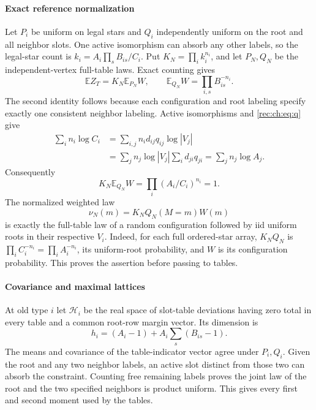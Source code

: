 \documentclass[11pt]{article}
\theoremstyle{definition}
\theoremstyle{remark}
\newcommand{\E}{\mathbb E}
\newcommand{\1}{\mathbf 1}
\begin{document}
\paragraph{Exact reference normalization}
Let $P_i$ be uniform on legal stars and $Q_i$ independently uniform on the root and all neighbor slots. One active isomorphism can absorb any other labels, so the legal-star count is $k_i=A_i\prod_sB_{is}/C_i$. Put $K_N=\prod_i k_i^{n_i}$, and let $P_N,Q_N$ be the independent-vertex full-table laws. Exact counting gives
\begin{equation}\label{rec:ch:eq:normalizers}
 \E Z_T=K_N\E_{P_N}W,\qquad
 \E_{Q_N}W=\prod_{i,s}B_{is}^{-n_i}.
\end{equation}
The second identity follows because each configuration and root labeling specify exactly one consistent neighbor labeling. Active isomorphisms and \eqref{rec:ch:eq:q} give
\begin{align*}
 \sum_i n_i\log C_i
 &=\sum_{i,j}n_id_{ij}q_{ij}\log|V_j|\\
 &=\sum_jn_j\log|V_j|\sum_i d_{ji}q_{ji}
 =\sum_jn_j\log A_j.
\end{align*}
Consequently
\begin{equation}\label{rec:ch:eq:exactone}
 K_N\E_{Q_N}W=\prod_i(A_i/C_i)^{n_i}=1.
\end{equation}
The normalized weighted law
\[
 \nu_N(m)=K_NQ_N(M=m)W(m)
\]
is exactly the full-table law of a random configuration followed by iid uniform roots in their respective $V_i$. Indeed, for each full ordered-star array, $K_NQ_N$ is $\prod_i C_i^{-n_i}=\prod_i A_i^{-n_i}$, its uniform-root probability, and $W$ is its configuration probability. This proves the assertion before passing to tables.

\paragraph{Covariance and maximal lattices}
At old type $i$ let $\mathcal H_i$ be the real space of slot-table deviations having zero total in every table and a common root-row margin vector. Its dimension is
\[
 h_i=(A_i-1)+A_i\sum_s(B_{is}-1).
\]
The means and covariance of the table-indicator vector agree under $P_i,Q_i$. Given the root and any two neighbor labels, an active slot distinct from those two can absorb the constraint. Counting free remaining labels proves the joint law of the root and the two specified neighbors is product uniform. This gives every first and second moment used by the tables.
\end{document}
